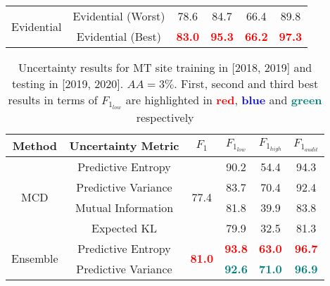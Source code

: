 \begin{table*}[ht!]
\begin{tabular}{c|c|c|ccc}
\multirow{2}{*}{Evidential} & Evidential (Worst)             & 78.6                           & 84.7            & 66.4             & 89.8              \\
                            & Evidential (Best)              & \textcolor{red}{\textbf{83.0}}                           & \textcolor{red}{\textbf{95.3}}            & \textcolor{red}{\textbf{66.2}}             & \textcolor{red}{\textbf{97.3}}              \\ \hline                            
\end{tabular}
\label{tab:MT_results_t1}
\end{table*}


\begin{table*}[ht!]
\centering
\caption{Uncertainty results for MT site training in [2018, 2019] and testing in [2019, 2020]. $AA=3\%$. First, second and third best results in terms of $F_{1_{low}}$ are highlighted in \textcolor{red}{\textbf{red}}, \textcolor{blue}{\textbf{blue}} and \textcolor{teal}{\textbf{green}} respectively}
\begin{tabular}{c|c|c|ccc}
\hline
\textbf{Method}             & \textbf{Uncertainty Metric} & \textbf{$F_1$}                    & \textbf{$F_{1_{low}}$} & \textbf{$F_{1_{high}}$} & \textbf{$F_{1_{audit}}$} \\ \hline
\multirow{4}{*}{MCD} & Predictive Entropy          & \multirow{4}{*}{77.4}          & 90.2            & 54.4             & 94.3              \\
                            & Predictive Variance         &                                & 83.7            & 70.4             & 92.4              \\
                            & Mutual Information          &                                & 81.8            & 39.9             & 83.8              \\
                            & Expected KL                 &                                & 79.9            & 32.5             & 81.3              \\ \hline
\multirow{4}{*}{Ensemble}   & Predictive Entropy          & \multirow{4}{*}{\textcolor{red}{\textbf{81.0}}} & \textcolor{red}{\textbf{93.8}}   & \textcolor{red}{\textbf{63.0}}    & \textcolor{red}{\textbf{96.7}}     \\
                            & Predictive Variance         &                                & \textcolor{teal}{\textbf{92.6}}            & \textcolor{teal}{\textbf{71.0}}             & \textcolor{teal}{\textbf{96.9}}              \\

\end{tabular}
\end{table*}
